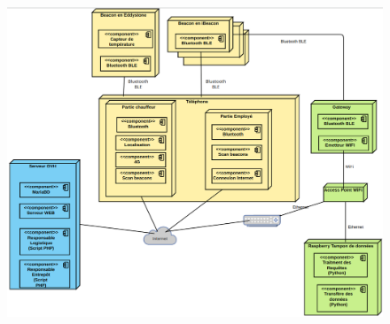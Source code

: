 \documentclass[10pt,a4paper]{book}
\begin{document}
\begin{figure}[h!]
    \centering
    \includegraphics[scale=0.2]{Images/diagramme_deploiement2.png}
    \caption{}
    \label{diagramme_deploiement2}
\end{figure}
\end{document}

